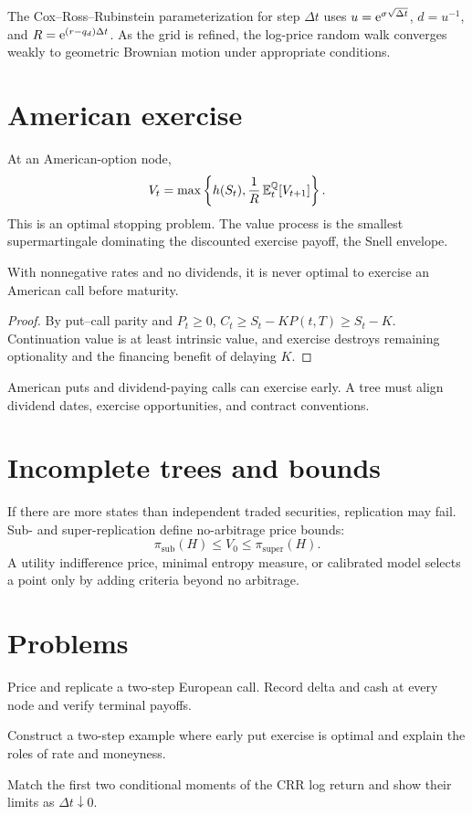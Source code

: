 The Cox--Ross--Rubinstein parameterization for step $\Delta t$ uses
$u=\mathrm e^{\sigma\sqrt{\Delta t}}$, $d=u^{-1}$, and
$R=\mathrm e^{(r-q_d)\Delta t}$. As the grid is refined, the log-price random walk
converges weakly to geometric Brownian motion under appropriate conditions.

\section{American exercise}

At an American-option node,
\[
V_t=\max\left\{h(S_t),
\frac1R\operatorname{\mathbb E}_t^\mathbb Q[V_{t+1}]\right\}.
\]
This is an optimal stopping problem. The value process is the smallest
supermartingale dominating the discounted exercise payoff, the Snell envelope.

\begin{proposition}
With nonnegative rates and no dividends, it is never optimal to exercise an American
call before maturity.
\end{proposition}
\begin{proof}
By put--call parity and $P_t\geq0$,
$C_t\geq S_t-KP(t,T)\geq S_t-K$. Continuation value is at least intrinsic value, and
exercise destroys remaining optionality and the financing benefit of delaying $K$.
\end{proof}

American puts and dividend-paying calls can exercise early. A tree must align
dividend dates, exercise opportunities, and contract conventions.

\section{Incomplete trees and bounds}

If there are more states than independent traded securities, replication may fail.
Sub- and super-replication define no-arbitrage price bounds:
\[
\pi_{\mathrm{sub}}(H)\leq V_0\leq\pi_{\mathrm{super}}(H).
\]
A utility indifference price, minimal entropy measure, or calibrated model selects a
point only by adding criteria beyond no arbitrage.

\section{Problems}

\begin{exercise}
Price and replicate a two-step European call. Record delta and cash at every node
and verify terminal payoffs.
\end{exercise}
\begin{exercise}
Construct a two-step example where early put exercise is optimal and explain the
roles of rate and moneyness.
\end{exercise}
\begin{exercise}
Match the first two conditional moments of the CRR log return and show their limits
as $\Delta t\downarrow0$.
\end{exercise}


